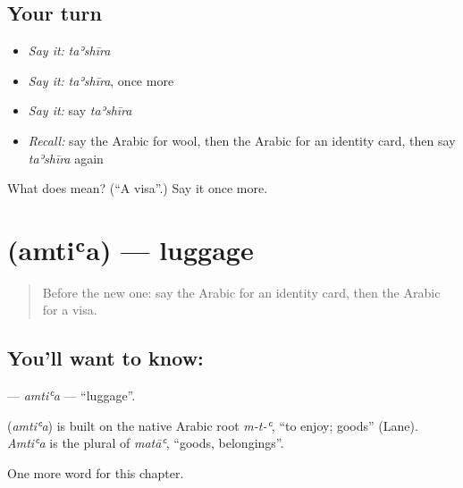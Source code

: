 \subsection*{Your turn}
\begin{itemize}
\raggedright
  \item \emph{Say it:} \emph{taʾshīra}
  \item \emph{Say it:} \emph{taʾshīra}, once more
  \item \emph{Say it:} say \emph{taʾshīra}
  \item \emph{Recall:} say the Arabic for wool, then the Arabic for an identity card, then say \emph{taʾshīra} again
\end{itemize}

\begin{tcolorbox}[breakable,colback=teal!4,colframe=teal!35!black,title={Before you move on}]
What does  mean? (\textquotedblleft{}A visa\textquotedblright{}.) Say it once more.
\end{tcolorbox}
\section[\texorpdfstring{\ar{أمتعة} (amtiʿa)}{أمتعة (amtiʿa)}]{ (amtiʿa) — luggage}

\label{lesson:AR-C215-amtia}



\begin{quote}
Before the new one: say the Arabic for an identity card, then the Arabic for a visa.
\end{quote}

\subsection*{You'll want to know: }
\textbf{} — \emph{amtiʿa} — \textquotedblleft{}luggage\textquotedblright{}.

\begin{cousinweb}
\textbf{} (\emph{amtiʿa}) is built on the native Arabic root \emph{m-t-ʿ}, \textquotedblleft{}to enjoy; goods\textquotedblright{} (Lane). \emph{Amtiʿa} is the plural of \emph{matāʿ}, \textquotedblleft{}goods, belongings\textquotedblright{}.
\end{cousinweb}

\begin{grammarlens}[title={What you've built}]
One more word for this chapter.
\end{grammarlens}

